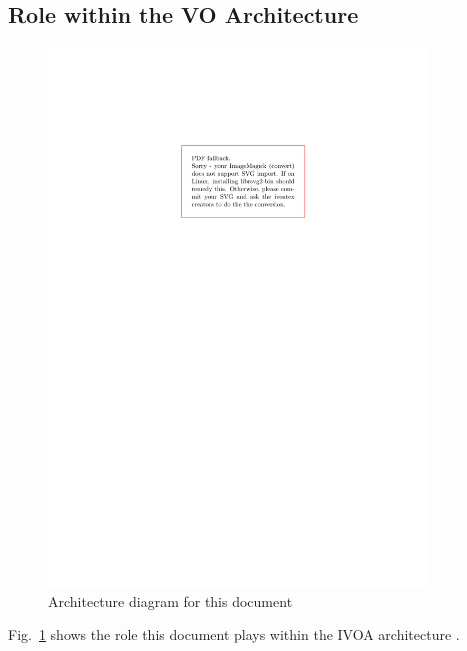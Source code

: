 \documentclass[11pt,a4paper]{ivoa}
\begin{document}
\subsection{Role within the VO Architecture}

\begin{figure}
\centering


\includegraphics[width=0.9\textwidth]{role_diagram.pdf}
\caption{Architecture diagram for this document}
\label{fig:archdiag}
\end{figure}

Fig.~\ref{fig:archdiag} shows the role this document plays within the
IVOA architecture \citep{note:VOARCH}.
\end{document}
